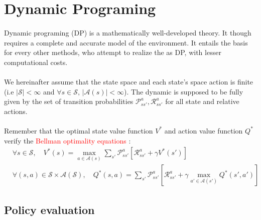 \documentclass[a4paper]{article}
\begin{document}
	
		
	\vhrulefill{2pt}
	
	\tableofcontents
	
	\vhrulefill{2pt}
	
	\section{Dynamic Programing}
	{
		\paragraph{} Dynamic programing (DP) is a mathematically well-developed theory. It though requires a complete and accurate model of the environment. It entails the basis for every other methods, who attempt to realize the as DP, with lesser computational costs. 
		
		\paragraph{} We hereinafter assume that the state space and each state's space action is finite (i.e $\vert \mathcal{S} \vert <\infty$ and $\forall{s}\in\mathcal{S}, \, \vert \mathcal{A}(s)\vert < \infty$). The dynamic is supposed to be fully given by the set of transition probabilities $\mathcal{P}_{ss'}^a, \mathcal{R}_{ss'}^a$ for all state and relative actions. 
		
		\paragraph{} Remember that the optimal state value function $V^*$ and action value function $Q^*$ verify the \textcolor{red}{Bellman optimality equations} : 
		\begin{equation}
			\begin{aligned}
			&\forall{s}\in\mathcal{S}, \quad V^*(s) = \max_{a\in\mathcal{A}(s)} \sum_{s'} \mathcal{P}_{ss'}^a \left[ \mathcal{R}_{ss'}^a + \gamma V^*(s')\right] \\
			&\forall{(s,a)}\in\mathcal{S}\times\mathcal{A}(\mathcal{S}), \quad Q^*(s,a) = \sum_{s'} \mathcal{P}_{ss'}^a \left[ \mathcal{R}_{ss'}^a + \gamma \max_{a'\in\mathcal{A}(s')} Q^*(s',a')\right] 
			\end{aligned}
		\end{equation}
		
		\subsection{Policy evaluation}
		{
}}
\end{document}
